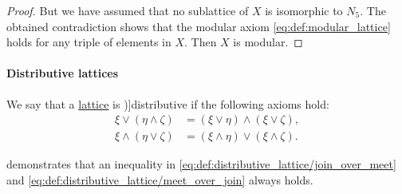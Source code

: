 \begin{proof}
  But we have assumed that no sublattice of \( X \) is isomorphic to \( N_5 \). The obtained contradiction shows that the modular axiom \eqref{eq:def:modular_lattice} holds for any triple of elements in \( X \). Then \( X \) is modular.
\end{proof}

\paragraph{Distributive lattices}

\begin{definition}\label{def:distributive_lattice}
  We say that a \hyperref[def:lattice]{lattice} is \term[ru=дистрибутивная (решётка) (\cite[def. 4.7]{Гуров2013})]{distributive} if the following axioms hold:
  \begin{align}
    \xi \vee (\eta \wedge \zeta) &= (\xi \vee \eta) \wedge (\xi \vee \zeta), \label{eq:def:distributive_lattice/join_over_meet} \\
    \xi \wedge (\eta \vee \zeta) &= (\xi \wedge \eta) \vee (\xi \wedge \zeta). \label{eq:def:distributive_lattice/meet_over_join}
  \end{align}
\end{definition}
\begin{comments}
  \item {} demonstrates that an inequality in \eqref{eq:def:distributive_lattice/join_over_meet} and \eqref{eq:def:distributive_lattice/meet_over_join} always holds.
\end{comments}

